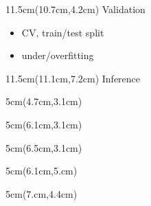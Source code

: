 \documentclass[aspectratio=169,usenames,dvipsnames]{beamer}
\begin{document}
\begin{frame}

\begin{textblock*}{11.5cm}(10.7cm,4.2cm)
	\Large
	\hspace{4mm}\textcolor{myorange}{Validation}
	\vspace{2mm}
	\begin{itemize}
		\footnotesize
		\item[$\circ$] CV, train/test split
		\item[?] under/overfitting
	\end{itemize}
\end{textblock*}

\begin{textblock*}{11.5cm}(11.1cm,7.2cm)
	\Large
	\textcolor{myorange}{Inference}
\end{textblock*}


\begin{textblock*}{5cm}(4.7cm,3.1cm)
\end{textblock*}

\begin{textblock*}{5cm}(6.1cm,3.1cm)
\end{textblock*}

\begin{textblock*}{5cm}(6.5cm,3.1cm)
\end{textblock*}


\begin{textblock*}{5cm}(6.1cm,5.cm)
\end{textblock*}


\begin{textblock*}{5cm}(7.cm,4.4cm)
\end{textblock*}


\end{frame}
\end{document}
